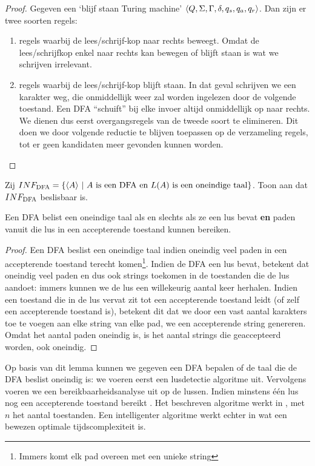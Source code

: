 \documentclass[a4paper]{article}
\begin{document}
\begin{question}
\begin{answer}
\begin{enumerate}
\begin{proof}
Gegeven een `blijf staan Turing machine' $\left\langle Q,\Sigma,\Gamma,\delta,q_s,q_a,q_r \right\rangle$. Dan zijn er twee soorten regels:
\begin{enumerate}
 \item regels waarbij de lees/schrijf-kop naar rechts beweegt. Omdat de lees/schrijfkop enkel naar rechts kan bewegen of blijft staan is wat we schrijven irrelevant.
 \item regels waarbij de lees/schrijf-kop blijft staan. In dat geval schrijven we een karakter weg, die onmiddellijk weer zal worden ingelezen door de volgende toestand.
Een DFA ``schuift'' bij elke invoer altijd onmiddellijk op naar rechts. We dienen dus eerst overgangsregels van de tweede soort te elimineren. Dit doen we door volgende reductie te blijven toepassen op de verzameling regels, tot er geen kandidaten meer gevonden kunnen worden.
\end{enumerate}

\end{proof}
\end{enumerate}
\end{answer}
\end{question}

\begin{question}
Zij $INF_{\rm DFA} = \{ \langle A \rangle \ | \ \text{$A$ is een DFA en $L(A)$ is een oneindige taal} \} $. Toon aan dat $INF_{\rm DFA}$ beslisbaar is.
\begin{answer}
\begin{lemma}
Een DFA belist een oneindige taal als en slechts als ze een lus bevat \textbf{en} paden vanuit die lus in een accepterende toestand kunnen bereiken.
\begin{proof}
Een DFA beslist een oneindige taal indien oneindig veel paden in een accepterende toestand terecht komen\footnote{Immers komt elk pad overeen met een unieke string}. Indien de DFA een lus bevat, betekent dat oneindig veel paden en dus ook strings toekomen in de toestanden die de lus aandoet: immers kunnen we de lus een willekeurig aantal keer herhalen. Indien een toestand die in de lus vervat zit tot een accepterende toestand leidt (of zelf een accepterende toestand is), betekent dit dat we door een vast aantal karakters toe te voegen aan elke string van elke pad, we een accepterende string genereren. Omdat het aantal paden oneindig is, is het aantal strings die geaccepteerd worden, ook oneindig.
\end{proof}
\end{lemma}
Op basis van dit lemma kunnen we gegeven een DFA bepalen of de taal die de DFA beslist oneindig is: we voeren eerst een lusdetectie algoritme uit. Vervolgens voeren we een bereikbaarheidsanalyse uit op de lussen. Indien minstens \'e\'en lus nog een accepterende toestand bereikt . Het beschreven algoritme werkt in , met $n$ het aantal toestanden. Een intelligenter algoritme werkt echter in  wat een bewezen optimale tijdscomplexiteit is.
\end{answer}

\end{question}
\end{document}
